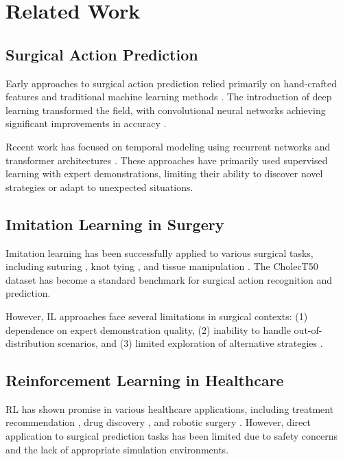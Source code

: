 \documentclass[conference]{IEEEtran}
\begin{document}
\section{Related Work}

\subsection{Surgical Action Prediction}

Early approaches to surgical action prediction relied primarily on hand-crafted features and traditional machine learning methods \cite{padoy2012statistical}. The introduction of deep learning transformed the field, with convolutional neural networks achieving significant improvements in accuracy \cite{twinanda2016endonet}.

Recent work has focused on temporal modeling using recurrent networks \cite{jin2017multi} and transformer architectures \cite{gao2022trans}. These approaches have primarily used supervised learning with expert demonstrations, limiting their ability to discover novel strategies or adapt to unexpected situations.

\subsection{Imitation Learning in Surgery}

Imitation learning has been successfully applied to various surgical tasks, including suturing \cite{murali2015learning}, knot tying \cite{schulman2016learning}, and tissue manipulation \cite{thananjeyan2017multilateral}. The CholecT50 dataset \cite{nwoye2022cholect50} has become a standard benchmark for surgical action recognition and prediction.

However, IL approaches face several limitations in surgical contexts: (1) dependence on expert demonstration quality, (2) inability to handle out-of-distribution scenarios, and (3) limited exploration of alternative strategies \cite{hussein2017imitation}.

\subsection{Reinforcement Learning in Healthcare}

RL has shown promise in various healthcare applications, including treatment recommendation \cite{gottesman2019guidelines}, drug discovery \cite{popova2018deep}, and robotic surgery \cite{richter2019open}. However, direct application to surgical prediction tasks has been limited due to safety concerns and the lack of appropriate simulation environments.
\end{document}
